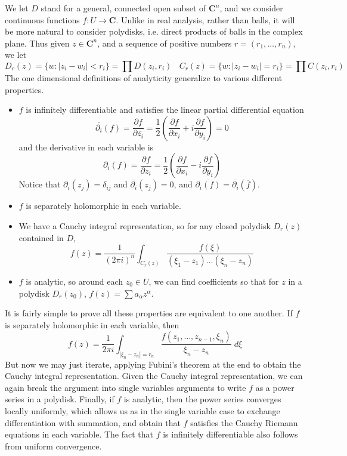 We let $D$ stand for a general, connected open subset of $\mathbf{C}^n$, and we consider continuous functions $f: U \to \mathbf{C}$. Unlike in real analysis, rather than balls, it will be more natural to consider polydisks, i.e. direct products of balls in the complex plane. Thus given $z \in \mathbf{C}^n$, and a sequence of positive numbers $r = (r_1, \dots, r_n)$, we let
%
\[ D_r(z) = \{ w: |z_i - w_i| < r_i \} = \prod D(z_i,r_i)\ \ \ \ C_r(z) = \{ w : |z_i - w_i| = r_i \} = \prod C(z_i,r_i) \]
%
The one dimensional definitions of analyticity generalize to various different properties. 
% 
\begin{itemize}
    \item $f$ is infinitely differentiable and satisfies the linear partial differential equation
    \[ \overline{\partial_i}(f) = \frac{\partial f}{\partial \overline{z_i}} = \frac{1}{2} \left( \frac{\partial f}{\partial x_i} + i \frac{\partial f}{\partial y_i} \right) = 0 \]
    and the derivative in each variable is
    \[ \partial_i(f) = \frac{\partial f}{\partial z_i} = \frac{1}{2} \left( \frac{\partial f}{\partial x_i} - i \frac{\partial f}{\partial y_i} \right) \]
    Notice that $\partial_i(z_j) = \delta_{ij}$ and $\overline{\partial_i}(z_j) = 0$, and $\overline{\partial_i(f)} = \overline{\partial_i}(\overline{f})$.

    \item $f$ is separately holomorphic in each variable.

    \item We have a Cauchy integral representation, so for any closed polydisk $D_r(z)$ contained in $D$,
    \[ f(z) = \frac{1}{(2 \pi i)^n} \int_{C_r(z)} \frac{f(\xi)}{(\xi_1 - z_1) \dots (\xi_n - z_n)} \]

    \item $f$ is analytic, so around each $z_0 \in U$, we can find coefficients so that for $z$ in a polydisk $D_r(z_0)$, $f(z) = \sum a_\alpha z^\alpha$.
\end{itemize}
%
It is fairly simple to prove all these properties are equivalent to one another. If $f$ is separately holomorphic in each variable, then
%
\[ f(z) = \frac{1}{2 \pi i} \int_{|\xi_n - z_n| = r_n} \frac{f(z_1, \dots, z_{n-1}, \xi_n)}{\xi_n - z_n}\; d\xi \]
%
But now we may just iterate, applying Fubini's theorem at the end to obtain the Cauchy integral representation. Given the Cauchy integral representation, we can again break the argument into single variables arguments to write $f$ as a power series in a polydisk. Finally, if $f$ is analytic, then the power series converges locally uniformly, which allows us as in the single variable case to exchange differentiation with summation, and obtain that $f$ satisfies the Cauchy Riemann equations in each variable. The fact that $f$ is infinitely differentiable also follows from uniform convergence.

